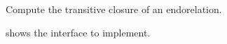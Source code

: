 
\begin{codeexercise}
    Compute the transitive closure of an endorelation.

     shows the interface to implement.
\end{codeexercise}

